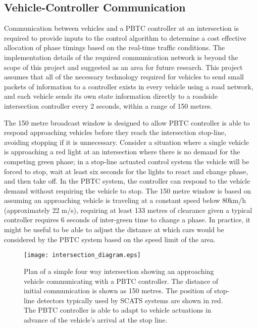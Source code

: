 \subsection{Vehicle-Controller Communication}

Communication between vehicles and a PBTC controller at an intersection is required to provide inputs to the control algorithm to determine a cost effective allocation of phase timings based on the real-time traffic conditions. The implementation details of the required communication network is beyond the scope of this project and suggested as an area for future research. This project assumes that all of the necessary technology required for vehicles to send small packets of information to a controller exists in every vehicle using a road network, and each vehicle sends its own state information directly to a roadside intersection controller every 2 seconds, within a range of 150 metres.

The 150 metre broadcast window is designed to allow PBTC controller is able to respond approaching vehicles before they reach the intersection stop-line, avoiding stopping if it is unnecessary. Consider a situation where a single vehicle is approaching a red light at an intersection where there is no demand for the competing green phase; in a stop-line actuated control system the vehicle will be forced to stop, wait at least six seconds for the lights to react and change phase, and then take off. In the PBTC system, the controller can respond to the vehicle demand without requiring the vehicle to stop. The 150 metre window is based on assuming an approaching vehicle is traveling at a constant speed below 80km/h (approximately 22 m/s), requiring at least 133 metres of clearance given a typical controller requires 6 seconds of inter-green time to change a phase. In practice, it might be useful to be able to adjust the distance at which cars would be considered by the PBTC system based on the speed limit of the area. 

\begin{figure}[]
\centering
	\texttt{[image: intersection\_diagram.eps]}
	\caption{ Plan of a simple four way intersection showing an approaching vehicle communicating with a PBTC controller. The distance of initial communication is shown as 150 metres. The position of stop-line detectors typically used by SCATS systems are shown in red. The PBTC controller is able to adapt to vehicle actuations in advance of the vehicle's arrival at the stop line. }
\label{intersectiondiagram}
\end{figure}

